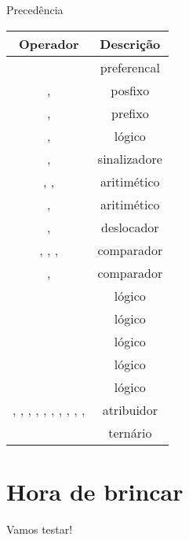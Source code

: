 \documentclass[11pt]{beamer}
\begin{document}
\begin{frame}{Precedência}
{\begin{table}[!h]
				\label{table.precedence}
				\begin{tabular}{cc}
					Operador & Descrição \\\hline
					\basicCode{()} & preferencal\\\hline
					\basicCode{++}, \basicCode{--} & posfixo \\\hline
					\basicCode{++}, \basicCode{--} & prefixo \\\hline
					\basicCode{\~}, \basicCode{!} & lógico \\\hline
					\basicCode{+}, \basicCode{-} & sinalizadore \\\hline
					\basicCode{*}, \basicCode{/}, \basicCode{\%} & aritimético \\
					\basicCode{+}, \basicCode{-} & aritimético \\\hline
					\basicCode{<<}, \basicCode{>>} & deslocador \\\hline
					\basicCode{<}, \basicCode{<=}, \basicCode{>=}, \basicCode{>} & comparador \\
					\basicCode{==}, \basicCode{!=} & comparador \\\hline
					\basicCode{\&} & lógico \\
					\basicCode{\^} & lógico \\
					\basicCode{|} & lógico \\
					\basicCode{\&\&} & lógico \\
					\basicCode{\|\|} & lógico \\\hline
					\basicCode{=}, \basicCode{+=}, \basicCode{-=}, \basicCode{*=}, \basicCode{/=}, \basicCode{\%=}, \basicCode{\&=}, \basicCode{\^=}, \basicCode{\|=}, \basicCode{<<=},  \basicCode{>>=} & atribuidor \\\hline
					\basicCode{?:} & ternário
				\end{tabular}
			\end{table}
		}
		{
			
		}
	\end{frame}
	
\section{Hora de brincar}
	\begin{frame}
		\begin{center}\Huge
			Vamos testar!
		\end{center}
	\end{frame}
\end{document}
